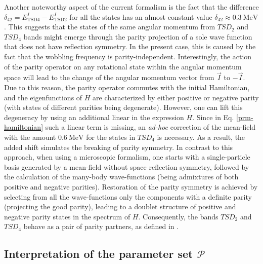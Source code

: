 \documentclass[myclassdoc,debug]{rjparticle}
\begin{document}
Another noteworthy aspect of the current formalism is the fact that the difference $\delta_{42}=E_\text{TSD4}^I-E_\text{TSD2}^I$ for all the states has an almost constant value $\delta_{42}\approx0.3\ \text{MeV}$. This suggests that the states of the same angular momentum from $TSD_2$ and $TSD_4$ bands might emerge through the parity projection of a sole wave function that does not have reflection symmetry. In the present case, this is caused by the fact that the wobbling frequency is parity-independent. Interestingly, the action of the parity operator on any rotational state within the angular momentum space will lead to the change of the angular momentum vector from $\vec{I}$ to $-\vec{I}$. Due to this reason, the parity operator commutes with the initial Hamiltonian, and the eigenfunctions of $H$ are characterized by either positive or negative parity (with states of different parities being degenerate). However, one can lift this degeneracy by using an additional linear in the expression $H$. Since in Eq. \ref{prm-hamiltonian} such a linear term is missing, an \emph{ad-hoc} correction of the mean-field with the amount $0.6\ \text{MeV}$ for the states in $TSD_4$ is necessary. As a result, the added shift simulates the breaking of parity symmetry. In contrast to this approach, when using a microscopic formalism, one starts with a single-particle basis generated by a mean-field without space reflection symmetry, followed by the calculation of the many-body wave-functions (being admixtures of both positive and negative parities). Restoration of the parity symmetry is achieved by selecting from all the wave-functions only the components with a definite parity (projecting the good parity), leading to a doublet structure of positive and negative parity states in the spectrum of $H$. Consequently, the bands $TSD_2$ and $TSD_4$ behave as a pair of parity partners, as defined in \cite{chasman1980incipient,raduta2006description,raduta2006simultaneous}.

\subsection{\texorpdfstring{Interpretation of the parameter set $\mathcal{P}$}%
                               {Interpretation of the parameter set P}}\label{results:interpret}
\end{document}
